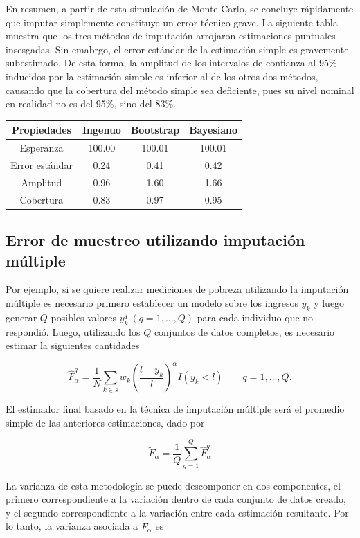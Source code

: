 \documentclass[
  10pt,
  spanish,
]{book}
\begin{document}
En resumen, a partir de esta simulación de Monte Carlo, se concluye rápidamente que imputar simplemente constituye un error técnico grave. La siguiente tabla muestra que los tres métodos de imputación arrojaron estimaciones puntuales insesgadas. Sin emabrgo, el error estándar de la estimación simple es gravemente subestimado. De esta forma, la amplitud de los intervalos de confianza al 95\% inducidos por la estimación simple es inferior al de los otros dos métodos, causando que la cobertura del método simple sea deficiente, pues su nivel nominal en realidad no es del 95\%, sino del 83\%.

\begin{longtable}[]{@{}cccc@{}}
\toprule
Propiedades & Ingenuo & Bootstrap & Bayesiano \\
\midrule
\endhead
Esperanza & 100.00 & 100.01 & 100.01 \\
Error estándar & 0.24 & 0.41 & 0.42 \\
Amplitud & 0.96 & 1.60 & 1.66 \\
Cobertura & 0.83 & 0.97 & 0.95 \\
\bottomrule
\end{longtable}

\hypertarget{error-de-muestreo-utilizando-imputaciuxf3n-muxfaltiple}{%
\subsection{Error de muestreo utilizando imputación múltiple}\label{error-de-muestreo-utilizando-imputaciuxf3n-muxfaltiple}}

Por ejemplo, si se quiere realizar mediciones de pobreza utilizando la imputación múltiple es necesario primero establecer un modelo sobre los ingresos \(y_k\) y luego generar \(Q\) posibles valores \(y_k^q \ (q=1, \ldots, Q)\) para cada individuo que no respondió. Luego, utilizando los \(Q\) conjuntos de datos completos, es necesario estimar la siguientes cantidades

\[
\hat{F}_{\alpha}^{q}=\frac{1}{N}\sum_{k\in s} w_k 
\left(\frac{l-y_k}{l}\right)^{\alpha}I(y_k<l) \ \ \ \ \ \ \ \ \ 
q= 1,\ldots, Q.
\]

El estimador final basado en la técnica de imputación múltiple será el promedio simple de las anteriores estimaciones, dado por

\[
\tilde{F}_{\alpha}=\frac{1}{Q}\sum_{q=1}^Q \hat{F}_{\alpha}^{q}
\]

La varianza de esta metodología se puede descomponer en dos componentes, el primero correspondiente a la variación dentro de cada conjunto de datos creado, y el segundo correspondiente a la variación entre cada estimación resultante. Por lo tanto, la varianza asociada a \(\tilde{F}_{\alpha}\) es
\end{document}
